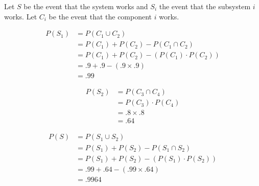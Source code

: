 \documentclass[letterpaper,12pt]{article}
\begin{document}
\begin{enumerate}
\begin{center}
    \end{center}
    Let $S$ be the event that the system works and $S_i$ the event that the subsystem $i$ works. Let $C_i$ be the event that the component $i$ works.
    \begin{minipage}[t]{.5\linewidth}
      \begin{align*}
        P(S_1) &= P(C_1 \cup C_2) \\
        &= P(C_1) + P(C_2) - P(C_1 \cap C_2) \\
        &= P(C_1) + P(C_2) - (P(C_1) \cdot P(C_2)) \\
        &= .9 + .9 - (.9 \times .9) \\
        & = .99
      \end{align*}
    \end{minipage}%
    \begin{minipage}[t]{.5\linewidth}
      \begin{align*}
        P(S_2) &= P(C_3 \cap C_4) \\
        &= P(C_3) \cdot P(C_4) \\
        &= .8 \times .8 \\
        &= .64
      \end{align*}
    \end{minipage}
    \begin{align*}
      P(S) &= P(S_1 \cup S_2) \\
      &= P(S_1) + P(S_2) - P(S_1 \cap S_2) \\
      &= P(S_1) + P(S_2) - (P(S_1) \cdot P(S_2)) \\
      &= .99 + .64 - (.99 \times .64) \\
      &= .9964
    \end{align*}

\end{enumerate}
\end{document}
